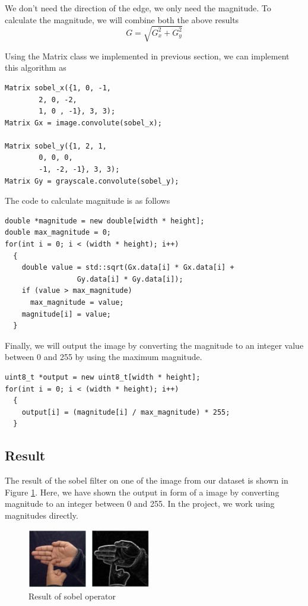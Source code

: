 \documentclass[a4paper,oneside,12pt]{report}
\begin{document}
We don't need the direction of the edge, we only need the magnitude. To calculate the magnitude, we will combine both the above results
\[ G = \sqrt{G_x^2 + G_y^2} \]

Using the Matrix class we implemented in previous section, we can implement this algorithm as
\begin{verbatim}
Matrix sobel_x({1, 0, -1,
		2, 0, -2,
		1, 0 , -1}, 3, 3);
Matrix Gx = image.convolute(sobel_x);

Matrix sobel_y({1, 2, 1,
		0, 0, 0,
		-1, -2, -1}, 3, 3);
Matrix Gy = grayscale.convolute(sobel_y);
\end{verbatim}

The code to calculate magnitude is as follows
\begin{verbatim}
double *magnitude = new double[width * height];
double max_magnitude = 0;
for(int i = 0; i < (width * height); i++)
  {
    double value = std::sqrt(Gx.data[i] * Gx.data[i] +
			     Gy.data[i] * Gy.data[i]);
    if (value > max_magnitude)
      max_magnitude = value;
    magnitude[i] = value;
  }
\end{verbatim}

Finally, we will output the image by converting the magnitude to an integer value between 0 and 255 by using the maximum magnitude.
\begin{verbatim}
uint8_t *output = new uint8_t[width * height];
for(int i = 0; i < (width * height); i++)
  {
    output[i] = (magnitude[i] / max_magnitude) * 255;
  }
\end{verbatim}

\subsection{Result}
\label{sec:orgb613d2c}
The result of the sobel filter on one of the image from our dataset is shown in Figure \ref{fig:org1a46e5f}. Here, we have shown the output in form of a image by converting magnitude to an integer between 0 and 255. In the project, we work using magnitudes directly.

\begin{figure}
\centering
\includegraphics[width=0.48\textwidth]{Sobel_Filter/2025-04-28_02-44-20_edgeresult.png}
\caption{\label{fig:org1a46e5f}Result of sobel operator}
\end{figure}
\end{document}

